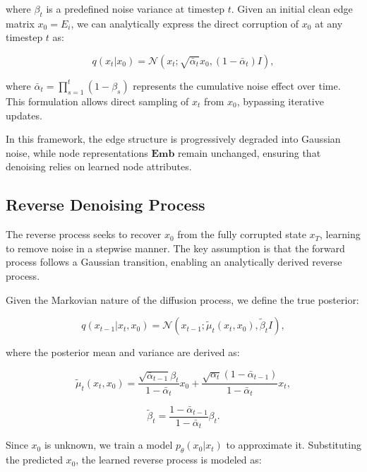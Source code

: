 where \( \beta_t \) is a predefined noise variance at timestep \( t \). Given an initial clean edge matrix \( x_0 = E_i \), we can analytically express the direct corruption of \( x_0 \) at any timestep \( t \) as:

\begin{equation*}
    q(x_t | x_0) = \mathcal{N}(x_t; \sqrt{\bar{\alpha}_t} x_0, (1 - \bar{\alpha}_t) I),
\end{equation*}

where \( \bar{\alpha}_t = \prod_{s=1}^{t} (1 - \beta_s) \) represents the cumulative noise effect over time. This formulation allows direct sampling of \( x_t \) from \( x_0 \), bypassing iterative updates.

In this framework, the edge structure is progressively degraded into Gaussian noise, while node representations \( \mathbf{Emb} \) remain unchanged, ensuring that denoising relies on learned node attributes.

\subsection{Reverse Denoising Process}

The reverse process seeks to recover \( x_0 \) from the fully corrupted state \( x_T \), learning to remove noise in a stepwise manner. The key assumption is that the forward process follows a Gaussian transition, enabling an analytically derived reverse process.

Given the Markovian nature of the diffusion process, we define the true posterior:

\begin{equation*}
    q(x_{t-1} | x_t, x_0) = \mathcal{N}(x_{t-1}; \tilde{\mu}_t(x_t, x_0), \tilde{\beta}_t I),
\end{equation*}

where the posterior mean and variance are derived as:

\begin{equation*}
    \tilde{\mu}_t(x_t, x_0) = \frac{\sqrt{\bar{\alpha}_{t-1}} \beta_t}{1 - \bar{\alpha}_t} x_0 + \frac{\sqrt{\alpha_t} (1 - \bar{\alpha}_{t-1})}{1 - \bar{\alpha}_t} x_t,
\end{equation*}

\begin{equation*}
    \tilde{\beta}_t = \frac{1 - \bar{\alpha}_{t-1}}{1 - \bar{\alpha}_t} \beta_t.
\end{equation*}

Since \( x_0 \) is unknown, we train a model \( p_{\theta}(x_0 | x_t) \) to approximate it. Substituting the predicted \( x_0 \), the learned reverse process is modeled as:

